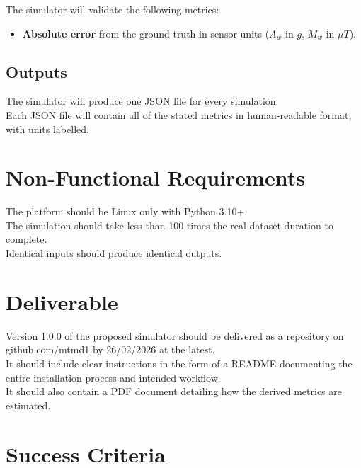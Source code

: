 \documentclass{article}
\begin{document}
\noindent The simulator will validate the following metrics:
\begin{itemize}
    \item \textbf{Absolute error} from the ground truth in sensor units ($A_w$ in $g$, $M_w$ in $\mu T$).\\
\end{itemize}

\subsection{Outputs}

The simulator will produce one JSON file for every simulation.\\

\noindent Each JSON file will contain all of the stated metrics in human-readable format, with units labelled.\\

\section{Non-Functional Requirements}

The platform should be Linux only with Python 3.10+.\\

\noindent The simulation should take less than 100 times the real dataset duration to complete.\\

\noindent Identical inputs should produce identical outputs.\\

\section{Deliverable}

Version 1.0.0 of the proposed simulator should be delivered as a repository on github.com/mtmd1 by 26/02/2026 at the latest.\\

\noindent It should include clear instructions in the form of a README documenting the entire installation process and intended workflow.\\

\noindent It should also contain a PDF document detailing how the derived metrics are estimated.\\

\section{Success Criteria}
\end{document}
